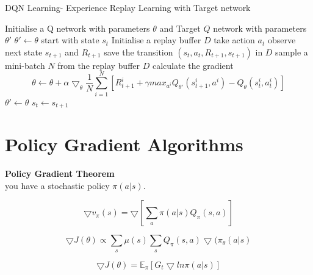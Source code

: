 \documentclass{article}
\begin{document}
\begin{algorithm}
\caption{DQN Learning- Experience Replay Learning with Target network}\label{alg:dqn_ex_replay_with_target}
\begin{algorithmic}
\State Initialise a Q network  with parameters $\theta$ and Target $Q$ network with parameters $\theta'$
\State $\theta' \leftarrow \theta$
\State start with state $s_t$
\State Initialise a replay buffer $D$
\State take action $a_t$ 
\State observe next state $s_{t+1}$ and $R_{t+1}$
\State save the transition $(s_t, a_t, R_{t+1}, s_{t+1})$ in $D$
\State sample a mini-batch $N$ from the replay buffer $D$
\State calculate the gradient $$ \theta \leftarrow \theta + \alpha \bigtriangledown_\theta \frac{1}{N}\sum\limits_{i=1}^N \left[ R_{t+1}^i + \gamma \textit{max}_{a^i} Q_{\theta'}(s_{t+1}^i, a^i ) - Q_\theta(s_t^i, a_t^i) \right]$$
\EndWhile
\State $\theta' \leftarrow \theta$
\State $s_t \leftarrow s_{t+1}$
\EndWhile
\end{algorithmic}
\end{algorithm}

\newpage
\section{Policy Gradient Algorithms}

\textbf{Policy Gradient Theorem}\\
you have a stochastic policy $\pi(a |s)$.

$$ \bigtriangledown v_\pi(s) = \bigtriangledown \left[ \sum_a \pi(a|s)Q_\pi(s,a) \right] $$

$$ \bigtriangledown J(\theta)  \propto  \sum_s\mu(s) \sum_s Q_\pi(s,a) \bigtriangledown  (\pi_\theta(a|s) $$

$$ \bigtriangledown J(\theta)  =  \mathbb{E}_\pi \left[ G_t \bigtriangledown ln \pi(a|s) \right]$$
\end{document}
